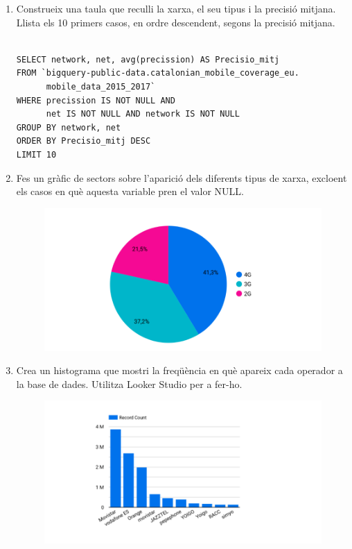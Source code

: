\documentclass[11pt,longbibliography]{article}
\theoremstyle{definition}
\theoremstyle{remark}
\begin{document}
\begin{enumerate}
\item Construeix una taula que reculli la xarxa, el seu tipus i la precisió mitjana. Llista els 10 primers casos, en ordre descendent, segons la precisió mitjana.

\begin{Verbatim}[frame=single]

SELECT network, net, avg(precission) AS Precisio_mitj
FROM `bigquery-public-data.catalonian_mobile_coverage_eu.
      mobile_data_2015_2017`
WHERE precission IS NOT NULL AND 
      net IS NOT NULL AND network IS NOT NULL
GROUP BY network, net
ORDER BY Precisio_mitj DESC
LIMIT 10
\end{Verbatim}

\item Fes un gràfic de sectors sobre l'aparició dels diferents tipus de xarxa, excloent els casos en què aquesta variable pren el valor NULL.

\vspace{2mm}
\begin{figure}[H]
\begin{center}
\includegraphics[width=12.5cm]{pbq1}
\end{center}
\label{fig:pbq1}
\end{figure}

\item Crea un histograma que mostri la freqüència en què apareix cada operador a la base de dades. Utilitza Looker Studio per a fer-ho.

\vspace{2mm}
\begin{figure}[H]
\begin{center}
\includegraphics[width=12.5cm]{pbq2}
\end{center}
\label{fig:pbq2}
\end{figure}

\end{enumerate}
\end{document}
